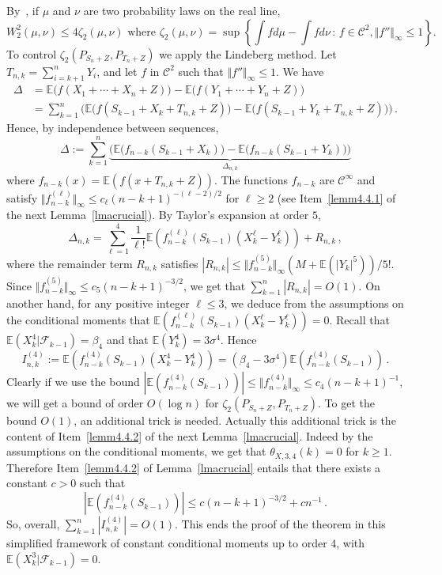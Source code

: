 \documentclass[10pt]{amsart}
\theoremstyle{definition}\newtheorem{defi}[theo]{Definition}\newtheorem{rema}[theo]{Remark}\newtheorem{exam}[theo]{Example}\newtheorem{exem}[theo]{Example}\newtheorem{nota}[theo]{Notation}
\newcommand{\bbE}{\mathbb{E}}
\newcommand{\clF}{\mathcal{F}}
\newcommand{\clC}{\mathcal{C}}
\begin{document}
By~\cite[Theorem~3.1]{Rio09}, if $\mu$ and $\nu$ are two probability laws on the real line,
\[
W^2_2 (\mu, \nu) \leq 4 \zeta_2 (\mu, \nu) \text{ where } \zeta_2 (\mu, \nu) = \sup \left\{ \int f d \mu - \int f d \nu \, : \, f \in \clC^2, \Vert f'' \Vert_{\infty} \leq 1\right\}.
\]
To control $ \zeta_2 (P_{S_n+Z}, P_{T_n+Z}) $ we apply the Lindeberg method. Let $T_{n,k} = \sum_{i=k+1}^n Y_i$, and let $f$ in $ \clC^2$ such that $ \Vert f'' \Vert_{\infty} \leq 1$. We have
\begin{align*}
\Delta & = \bbE \big(f (X_1+\cdots + X_n + Z)\big) - \bbE \big(f (Y_1+\cdots + Y_n + Z)\big) \\
& = \sum_{k=1}^n \Big(\bbE \big(f (S_{k-1} + X_k + T_{n,k} + Z)\big) - \bbE \big(f (S_{k-1} + Y_k + T_{n,k} + Z)\big) \Big) \,.
\end{align*}
Hence, by independence between sequences,
\[
\Delta := \sum_{k=1}^n \underbrace{ \Big (\bbE \big(f _{n-k}(S_{k-1} + X_k)\big) - \bbE \big(f _{n-k} (S_{k-1} + Y_k)\big) \Big)}_{ \Delta_{n,k} }
\]
where $f_{n-k} (x) =\bbE (f (x+ T_{n,k} + Z))$. The functions $f_{n-k}$ are $ \clC^{\infty}$ and satisfy $
\Vert f^{(\ell)}_{n-k} \Vert_{\infty} \leq c_{\ell} (n-k+1)^{-(\ell -2) /2 } $ for $\ell \geq 2$ (see Item~\eqref{lemm4.4.1} of the next Lemma~\ref{lmacrucial}). By Taylor's expansion at order $5$,
\[
\Delta_{n,k} = \sum_{\ell =1}^4 \frac{1 }{\ell !} \bbE \left (f^{(\ell)}_{n-k}(S_{k-1}) \left(X_k^{\ell} - Y_k^{\ell}\right) \right) +R_{n,k} \,,
\]
where the remainder term $R_{n,k}$ satisfies $|R_{n,k}| \leq \Vert f^{(5)}_{n-k} \Vert_{\infty} (M + \bbE (|Y_k|^5))/5! $. Since $\Vert f^{(5)}_{n-k} \Vert_{\infty} \leq c_{5} (n-k+1)^{-3 /2 } $, we get that $\sum_{k=1}^n |R_{n,k}| = O (1) $. On another hand, for any positive integer $\ell \leq 3$, we deduce from the assumptions on the conditional moments that $\bbE  (f^{(\ell)}_{n-k}(S_{k-1}) (X_k^{\ell} - Y_k^{\ell}) ) =0$. Recall that $\bbE(X^4_k | \clF_{k-1}) =\beta_4$ and that $ \bbE (Y_k^{4}) = 3 \sigma^4$. Hence
\[
I^{(4)}_{n,k} := \bbE \left(f^{(4)}_{n-k}(S_{k-1}) \left(X_k^{4} - Y_k^{4}\right) \right) = \left(\beta_4- 3 \sigma^4\right) \bbE \left(f^{(4)}_{n-k}(S_{k-1}) \right) \,.
\]
Clearly if we use the bound $| \bbE (f^{(4)}_{n-k}(S_{k-1})) | \leq \Vert f^{(4)}_{n-k} \Vert_{\infty} \leq c_4 (n-k+1)^{-1}$, we will get a bound of order $O (\log n)$ for $ \zeta_2 (P_{S_n+Z}, P_{T_n+Z}) $. To get the bound $O(1)$, an additional trick is needed. Actually this additional trick is the content of Item~\eqref{lemm4.4.2} of the next Lemma~\ref{lmacrucial}. Indeed by the assumptions on the conditional moments, we get that $\theta_{X,3,4} (k) =0$ for $k \geq 1$. Therefore Item~\eqref{lemm4.4.2} of Lemma~\ref{lmacrucial} entails that there exists a constant $c>0$ such that
\[
\left| \bbE \left(f_{n-k}^{(4) } ({ S}_{k-1})\right) \right | \leq c (n-k+1)^{-3/2} + c n^{ -1} \,.
\]
So, overall, $\sum_{k=1}^n |I^{(4)}_{n,k}| = O(1)$. This ends the proof of the theorem in this simplified framework of constant conditional moments up to order $4$, with $\bbE (X^3_k | \clF_{k-1}) =0$.
\end{document}

